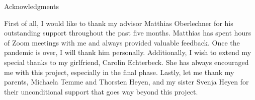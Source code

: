 \thispagestyle{empty}

\vspace*{20mm}

\begin{center}
{ Acknowledgments}
\end{center}

\vspace{10mm}

First of all, I would like to thank my advisor Matthias Oberlechner for his outstanding support throughout the past five months. Matthias has spent hours of Zoom meetings with me and always provided valuable feedback. Once the pandemic is over, I will thank him personally. Additionally, I wish to extend my special thanks to my girlfriend, Carolin Echterbeck. She has always encouraged me with this project, especially in the final phase. Lastly, let me thank my parents, Michaela Temme and Thorsten Heyen, and my sister Svenja Heyen for their unconditional support that goes way beyond this project.

\cleardoublepage{}
